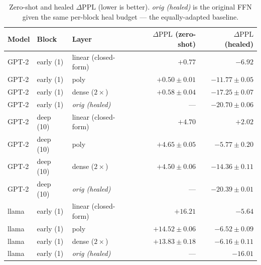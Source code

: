 \documentclass{article}
\newcommand{\dppl}{\Delta\mathrm{PPL}}
\begin{document}
\begin{table}[t]
  \centering
  \small
  \caption{Zero-shot and healed $\dppl$ (lower is better). \emph{orig (healed)} is the original
  FFN given the same per-block heal budget --- the equally-adapted baseline.}
  \label{tab:ppl}
  \begin{tabular}{lllrr}
    \toprule
    Model & Block & Layer & $\dppl$ (zero-shot) & $\dppl$ (healed) \\
    \midrule
    GPT-2 & early (1) & linear (closed-form) & $\mathbf{+0.77}$ & $-6.92$ \\
    GPT-2 & early (1) & poly                 & $\mathbf{+0.50 \pm 0.01}$ & $-11.77 \pm 0.05$ \\
    GPT-2 & early (1) & dense ($2\times$)    & $\mathbf{+0.58 \pm 0.04}$ & $-17.25 \pm 0.07$ \\
    GPT-2 & early (1) & \emph{orig (healed)} & --- & $\mathbf{-20.70 \pm 0.06}$ \\
    GPT-2 & deep (10) & linear (closed-form) & $+4.70$ & $+2.02$ \\
    GPT-2 & deep (10) & poly                 & $+4.65 \pm 0.05$ & $-5.77 \pm 0.20$ \\
    GPT-2 & deep (10) & dense ($2\times$)    & $+4.50 \pm 0.06$ & $-14.36 \pm 0.11$ \\
    GPT-2 & deep (10) & \emph{orig (healed)} & --- & $\mathbf{-20.39 \pm 0.01}$ \\
    llama & early (1) & linear (closed-form) & $+16.21$ & $-5.64$ \\
    llama & early (1) & poly                 & $+14.52 \pm 0.06$ & $-6.52 \pm 0.09$ \\
    llama & early (1) & dense ($2\times$)    & $+13.83 \pm 0.18$ & $-6.16 \pm 0.11$ \\
    llama & early (1) & \emph{orig (healed)} & --- & $\mathbf{-16.01}$ \\
    \bottomrule
  \end{tabular}
\end{table}
\end{document}
